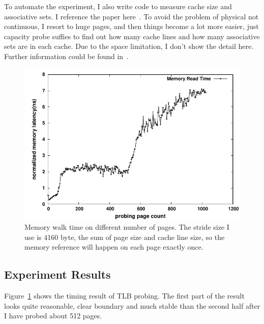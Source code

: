 To automate the experiment, I also write code to measure cache size and
associative sets. I reference the paper here~\cite{sigmetrics:cache}. To avoid
the problem of physical not continuous, I resort to huge pages, and then things
become a lot more easier, just capacity probe suffies to find out how many
cache lines and how many associative sets are in each cache. Due to the space limitation, I don't show the detail here. Further information could be found in~\cite{github}.

\begin{figure}[hpb]
\centering
\includegraphics[width=0.8\linewidth]{../figures/time}
\caption{Memory walk time on different number of pages. The stride size I use is 4160 byte, the sum of page size and cache line size, so the memory reference will happen on each page exactly once.}
\label{fig:tlbsz-time}
\end{figure}

\subsection{Experiment Results}

%
%
%
%
Figure~\ref{fig:tlbsz-time} shows the timing result of TLB probing. The first
part of the result looks quite reasonable, clear boundary and much stable
than the second half after I have probed about 512 pages.

